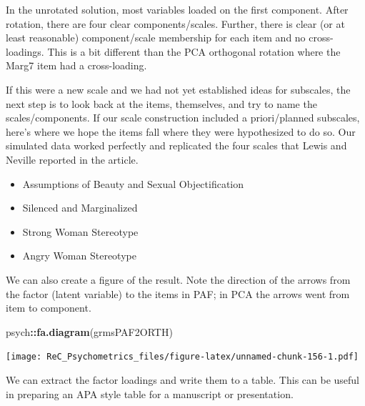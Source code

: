\documentclass[
  english,
]{book}
\newenvironment{Shaded}{\begin{snugshade}}{\end{snugshade}}
\newcommand{\CommentTok}[1]{\textcolor[rgb]{0.56,0.35,0.01}{\textit{#1}}}
\newcommand{\DataTypeTok}[1]{\textcolor[rgb]{0.13,0.29,0.53}{#1}}
\newcommand{\DecValTok}[1]{\textcolor[rgb]{0.00,0.00,0.81}{#1}}
\newcommand{\KeywordTok}[1]{\textcolor[rgb]{0.13,0.29,0.53}{\textbf{#1}}}
\newcommand{\NormalTok}[1]{#1}
\newcommand{\OperatorTok}[1]{\textcolor[rgb]{0.81,0.36,0.00}{\textbf{#1}}}
\newcommand{\OtherTok}[1]{\textcolor[rgb]{0.56,0.35,0.01}{#1}}
\newcommand{\StringTok}[1]{\textcolor[rgb]{0.31,0.60,0.02}{#1}}
\providecommand{\tightlist}{%
  \setlength{\itemsep}{0pt}\setlength{\parskip}{0pt}}
\begin{document}
In the unrotated solution, most variables loaded on the first component. After rotation, there are four clear components/scales. Further, there is clear (or at least reasonable) component/scale membership for each item and no cross-loadings. This is a bit different than the PCA orthogonal rotation where the Marg7 item had a cross-loading.

If this were a new scale and we had not yet established ideas for subscales, the next step is to look back at the items, themselves, and try to name the scales/components. If our scale construction included a priori/planned subscales, here's where we hope the items fall where they were hypothesized to do so. Our simulated data worked perfectly and replicated the four scales that Lewis and Neville \citep{lewis_construction_2015} reported in the article.

\begin{itemize}
\tightlist
\item
  Assumptions of Beauty and Sexual Objectification
\item
  Silenced and Marginalized
\item
  Strong Woman Stereotype
\item
  Angry Woman Stereotype
\end{itemize}

We can also create a figure of the result. Note the direction of the arrows from the factor (latent variable) to the items in PAF; in PCA the arrows went from item to component.

\begin{Shaded}
\begin{Highlighting}[]
\NormalTok{psych}\OperatorTok{::}\KeywordTok{fa.diagram}\NormalTok{(grmsPAF2ORTH)}
\end{Highlighting}
\end{Shaded}

\texttt{[image: ReC\_Psychometrics\_files/figure-latex/unnamed-chunk-156-1.pdf]}

We can extract the factor loadings and write them to a table. This can be useful in preparing an APA style table for a manuscript or presentation.

\begin{Shaded}
\end{Shaded}
\end{document}
